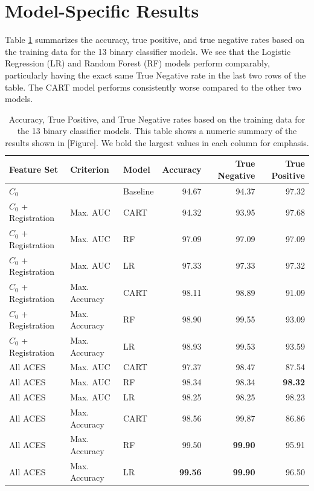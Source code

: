 \documentclass[11pt,]{isuthesis}
\begin{document}
\hypertarget{model-specific-results}{%
\section{Model-Specific Results}\label{model-specific-results}}

Table \ref{tab:trainDataResults} summarizes the accuracy, true positive, and true negative rates based on the training data for the 13 binary classifier models.
We see that the Logistic Regression (LR) and Random Forest (RF) models perform comparably, particularly having the exact same True Negative rate in the last two rows of the table.
The CART model performs consistently worse compared to the other two models.

\begin{table}

\caption{\label{tab:trainDataResults}Accuracy, True Positive, and True Negative rates based on the training data for the 13 binary classifier models. This table shows a numeric summary of the results shown in [Figure]. We bold the largest values in each column for emphasis.}
\centering
\begin{tabular}[t]{lllrrr}
\toprule
Feature Set & Criterion & Model & Accuracy & True Negative & True Positive\\
\midrule
$C_0$ &  & Baseline & 94.67 & 94.37 & 97.32\\
\addlinespace
$C_0$ + Registration & Max. AUC & CART & 94.32 & 93.95 & 97.68\\
$C_0$ + Registration & Max. AUC & RF & 97.09 & 97.09 & 97.09\\
$C_0$ + Registration & Max. AUC & LR & 97.33 & 97.33 & 97.32\\
\addlinespace
$C_0$ + Registration & Max. Accuracy & CART & 98.11 & 98.89 & 91.09\\
$C_0$ + Registration & Max. Accuracy & RF & 98.90 & 99.55 & 93.09\\
$C_0$ + Registration & Max. Accuracy & LR & 98.93 & 99.53 & 93.59\\
\addlinespace
All ACES & Max. AUC & CART & 97.37 & 98.47 & 87.54\\
All ACES & Max. AUC & RF & 98.34 & 98.34 & \textbf{98.32}\\
All ACES & Max. AUC & LR & 98.25 & 98.25 & 98.23\\
\addlinespace
All ACES & Max. Accuracy & CART & 98.56 & 99.87 & 86.86\\
All ACES & Max. Accuracy & RF & 99.50 & \textbf{99.90} & 95.91\\
All ACES & Max. Accuracy & LR & \textbf{99.56} & \textbf{99.90} & 96.50\\
\bottomrule
\end{tabular}
\end{table}
\end{document}
